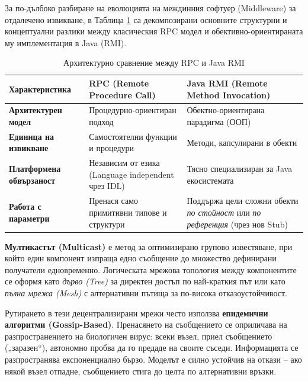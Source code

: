 \documentclass{scrartcl}
\begin{document}
\begin{FlushLeft}
За по-дълбоко разбиране на еволюцията на междинния софтуер (Middleware) за отдалечено извикване, в Таблица \ref{tab:rpc_vs_rmi} са декомпозирани основните структурни и концептуални разлики между класическия RPC модел и обективно-ориентираната му имплементация в Java (RMI).

\begin{table}[H]
    \centering
    \caption{Архитектурно сравнение между RPC и Java RMI}
    \label{tab:rpc_vs_rmi}
    \vspace{0.2cm}
    \begin{tabularx}{\textwidth}{l X X}
        \toprule
        \textbf{Характеристика} & \textbf{RPC (Remote Procedure Call)} & \textbf{Java RMI (Remote Method Invocation)} \\
        \midrule
        \textbf{Архитектурен модел} & Процедурно-ориентиран подход & Обектно-ориентирана парадигма (ООП) \\
        \addlinespace
        \textbf{Единица на извикване} & Самостоятелни функции и процедури & Методи, капсулирани в обекти \\
        \addlinespace
        \textbf{Платформена обвързаност} & Независим от езика (Language independent чрез IDL) & Тясно специализиран за Java екосистемата \\
        \addlinespace
        \textbf{Работа с параметри} & Пренася само примитивни типове и структури & Поддържа цели сложни обекти \textit{по стойност} или \textit{по референция} (чрез нов Stub) \\
        \bottomrule
    \end{tabularx}
\end{table}

\textbf{Мултикастът (Multicast)} е метод за оптимизирано групово известяване, при който един компонент изпраща едно съобщение до множество дефинирани получатели едновременно. Логическата мрежова топология между компонентите се оформя като \textit{дърво (Tree)} за директен достъп по най-краткия път или като \textit{пълна мрежа (Mesh)} с алтернативни пътища за по-висока отказоустойчивост.

Рутирането в тези децентрализирани мрежи често използва \textbf{епидемични алгоритми (Gossip-Based)}. Пренасянето на съобщението се оприличава на разпространението на биологичен вирус: всеки възел, приел съобщението („заразен“), автономно пробва да го предаде на своите съседи. Информацията се разпространява експоненциално бързо. Моделът е силно устойчив на откази – ако някой възел отпадне, съобщението стига до целта по алтернативни връзки.


\end{FlushLeft}
\end{document}
